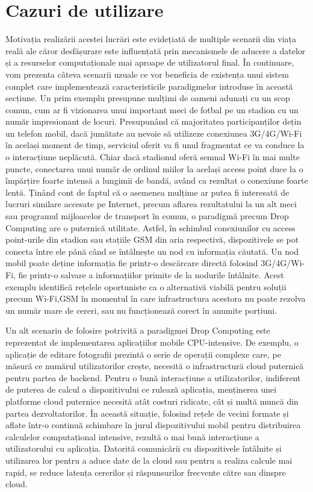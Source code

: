 \documentclass[12pt,a4paper]{report}
\begin{document}
\section{Cazuri de utilizare}
Motivația realizării acestei lucrări este evidețiată de multiple scenarii din viața reală ale căror desfășurare este influențată prin mecanismele de aducere a datelor și a resurselor computaționale mai aproape de utilizatorul final. În continuare, vom prezenta câteva scenarii uzuale ce vor beneficia de existența unui sistem complet care implementează caracteristicile paradigmelor introduse în această secțiune. Un prim exemplu presupune mulțimi de oameni adunați cu un scop comun, cum ar fi vizionarea unui important meci de fotbal pe un stadion cu un număr impresionant de locuri. Presupunând că majoritatea participanților dețin un telefon mobil, dacă jumătate au nevoie să utilizeze conexiunea 3G/4G/Wi-Fi în același moment de timp, serviciul oferit va fi unul fragmentat ce va conduce la o interacțiune neplăcută. Chiar dacă stadionul oferă semnal Wi-Fi în mai multe puncte, conectarea unui număr de ordinul miilor la același access point duce la o împărțire foarte intensă a lungimii de bandă, având ca rezultat o conexiune foarte lentă. Ținând cont de faptul că o asemenea mulțime ar putea fi interesată de lucruri similare accesate pe Internet, precum aflarea rezultatului la un alt meci sau programul mijloacelor de transport în comun, o paradigmă precum Drop Computing are o puternică utilitate. Astfel, în schimbul conexiunilor cu access point-urile din stadion sau stațiile GSM din aria respectivă, dispozitivele se pot conecta între ele până când se întâlnește un nod cu informația căutată. Un nod mobil poate deține informația fie printr-o descărcare directă folosind 3G/4G/Wi-Fi, fie printr-o salvare a informațiilor primite de la nodurile întâlnite. Acest exemplu identifică rețelele oportuniste ca o alternativă viabilă pentru soluții precum Wi-Fi,GSM în momentul în care infrastructura acestora nu poate rezolva un număr mare de cereri, sau nu funcționează corect în anumite porțiuni.

Un alt scenariu de folosire potrivită a paradigmei Drop Computing este reprezentat de implementarea aplicațiilor mobile CPU-intensive. De exemplu, o aplicație de editare fotografii prezintă o serie de operații complexe care, pe măsură ce numărul utilizatorilor crește, necesită o infrastructură cloud puternică pentru partea de backend. Pentru o bună interacțiune a utilizatorilor, indiferent de puterea de calcul a dispozitivului ce rulează aplicația, menținerea unei platforme cloud puternice necesită atât costuri ridicate, cât și multă muncă din partea dezvoltatorilor. În această situație, folosind rețele de vecini formate și aflate într-o continuă schimbare în jurul dispozitivului mobil pentru distribuirea calculelor computațional intensive, rezultă o mai bună interacțiune a utilizatorului cu aplicația. Datorită comunicării cu dispozitivele întâlnite și utilizarea lor pentru a aduce date de la cloud sau pentru a realiza calcule mai rapid, se reduce latența cererilor și răspunsurilor frecvente către sau dinspre cloud.
\end{document}
